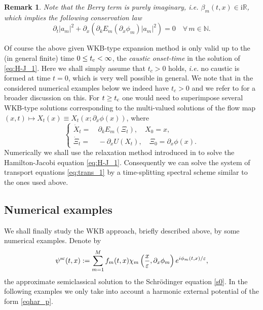 \documentclass[leqno,final]{siamltex}
\newtheorem{remark}{Remark}[section]
\numberwithin{equation}{section}
\newcounter{me}
\begin{document}
\begin{remark}
Note that the Berry term is purely imaginary, {{\sl i.e.\/ }} $\beta_m(t,x)
\in {\mathrm{i}} {{\mathbb R}}$, which implies the following conservation law \begin{equation} {\partial}_t
|a_m|^2  + \partial_x\left(\partial_k E_m(\partial_x\phi_m)
|a_m|^2 \right) =0 \quad \forall \, m \in {{\mathbb N }}. \end{equation}
\end{remark}
Of course the above given WKB-type expansion method is only valid
up to the (in general finite) time $0\leq t_{\rm c}<\infty$, the
\emph{caustic onset-time} in the solution of \eqref{eq:H-J_1}.
Here we shall simply assume that $t_c >0$ holds, {{\sl i.e.\/ }} no caustic is
formed at time $t=0$, which is very well possible in general. We
note that in the considered numerical examples below we indeed
have $t_c>0$ and we refer to \cite{Ca} for a broader discussion on
this. For $t\geq t_{\rm c}$ one would need to superimpose several
WKB-type solutions corresponding to the multi-valued solutions of
the flow map $(x,t)\mapsto X_t(x)\equiv X_t(x;\partial_x\phi(x))$,
where
\begin{equation}
\label{semi} \left \{
\begin{aligned}
\dot X_t = & \ \partial_k E_m(\Xi_t),\quad X_{0}=x,\\
\dot \Xi_t = & \ -\partial_x U(X_t) ,\quad \Xi_0=\partial_x
\phi(x).
\end{aligned}
\right.
\end{equation}
Numerically we shall use the relaxation method introduced in
\cite{JiXi} to solve the Hamilton-Jacobi equation
\eqref{eq:H-J_1}. Consequently we can solve the system of
transport equations \eqref{eq:trans_1} by a time-splitting
spectral scheme similar to the ones used above.

\subsection{Numerical examples} We shall finally study the WKB approach,
briefly described above,
by some numerical examples. Denote by \begin{equation} \psi^{\rm sc} (t,x):=
\sum_{m=1}^M f_m(t,x) \chi_m \left({\frac{{x}}{{{\varepsilon }}}},\partial_x
\phi_m\right)e^{i\phi_m(t,x)/{{\varepsilon }}}, \end{equation} the approximate
semiclassical solution to the Schr\"odinger equation \eqref{s0}.
In the following examples we only take into account a harmonic
external potential of the form \eqref{eqhar_p}.
\end{document}
